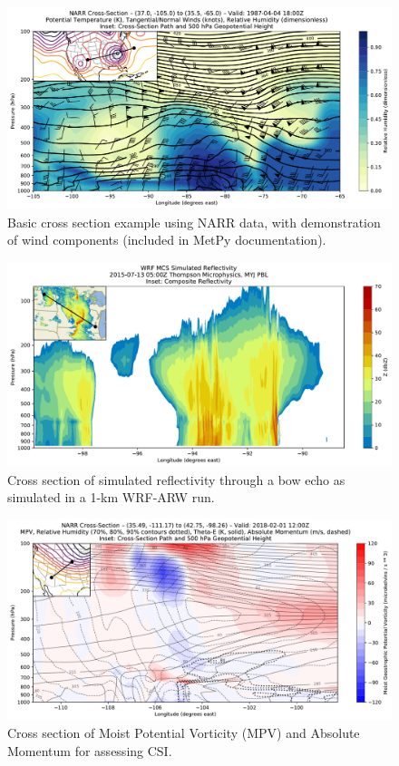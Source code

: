 \documentclass[final]{beamer}
\newlength{\colwidth}
\begin{document}
\begin{frame}[t, fragile]
\begin{columns}[t]
\begin{column}{\colwidth}
\begin{exampleblock}
    \begin{figure}
      \centering
      \includegraphics[width=\colwidth]{figures/basic_example_narr.pdf}
      \caption{Basic cross section example using NARR data, with demonstration of wind components (included in MetPy documentation).}
    \end{figure}
    \begin{figure}
      \centering
      \includegraphics[width=\colwidth]{figures/wrf_refl.pdf}
      \caption{Cross section of simulated reflectivity through a bow echo as simulated in a 1-km WRF-ARW run.}
    \end{figure}
    \begin{figure}
      \centering
      \includegraphics[width=\colwidth]{figures/csi_example_narr.pdf}
      \caption{Cross section of Moist Potential Vorticity (MPV) and Absolute Momentum for assessing CSI.}
    \end{figure}


\end{exampleblock}
\end{column}
\end{columns}
\end{frame}
\end{document}
